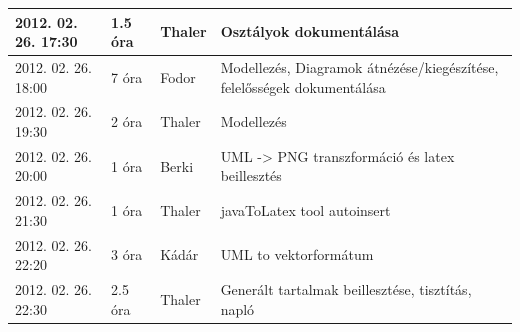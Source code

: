 \begin{center}
\begin{tabular}{| l | p{1.9cm} | p{2.6cm} | p{6.1cm} |}
2012. 02. 26. 17:30 & 1.5 óra & Thaler & Osztályok dokumentálása\\ \hline
2012. 02. 26. 18:00 & 7 óra & Fodor & Modellezés, Diagramok átnézése/kiegészítése, felelősségek dokumentálása\\ \hline
2012. 02. 26. 19:30 & 2 óra & Thaler & Modellezés\\ \hline
2012. 02. 26. 20:00 & 1 óra & Berki & UML -> PNG transzformáció és latex beillesztés\\ \hline
2012. 02. 26. 21:30 & 1 óra & Thaler & javaToLatex tool autoinsert\\ \hline
2012. 02. 26. 22:20 & 3 óra & Kádár & UML to vektorformátum\\ \hline
2012. 02. 26. 22:30 & 2.5 óra & Thaler & Generált tartalmak beillesztése, tisztítás, napló\\ \hline

            \hline
        \end{tabular}
    \end{center}

